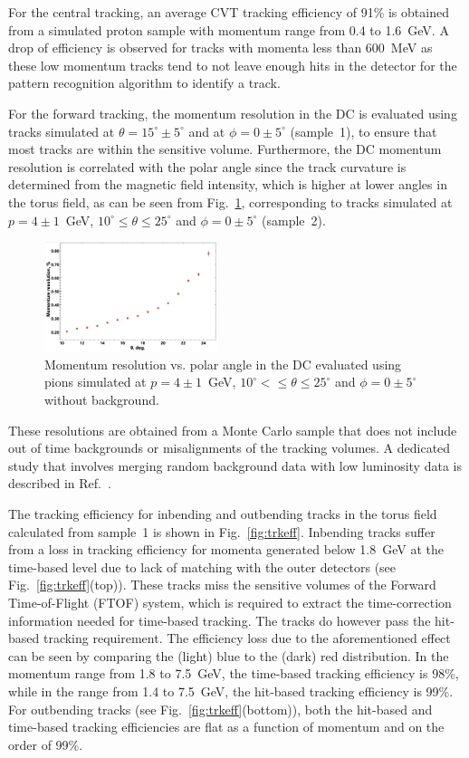 For the central tracking, an average CVT tracking efficiency of 91\% is obtained from a simulated proton sample with
momentum range from 0.4 to 1.6~GeV. A drop of efficiency is observed for tracks with momenta less than 600~MeV
as these low momentum tracks tend to not leave enough hits in the detector for the pattern recognition algorithm to
identify a track.  

For the forward tracking, the momentum resolution in the DC is evaluated using tracks simulated at
$\theta =15^\circ \pm 5^\circ$ and at $\phi = 0 \pm 5^\circ$ (sample~1), to ensure that most tracks are within the
sensitive volume. Furthermore, the DC momentum resolution is correlated with the polar angle since the track
curvature is determined from the magnetic field intensity, which is higher at lower angles in the torus field, as can
be seen from Fig.~\ref{fig:restheta}, corresponding to tracks simulated at $p=4\pm 1$~GeV,
$10^\circ \leq \theta \leq 25^\circ$ and $\phi = 0 \pm 5^\circ$ (sample~2).

\begin{figure}
\includegraphics[width=0.45\textwidth]{pics/DCRes2.png}
\caption{Momentum resolution vs. polar angle in the DC evaluated using pions simulated at $p=4\pm 1$~GeV,
  $10^\circ <\leq \theta \leq 25^\circ$ and $\phi = 0 \pm 5^\circ$ without background.}
\label{fig:restheta}
\end{figure}

These resolutions are obtained from a Monte Carlo sample that does not include out of time backgrounds or
misalignments of the tracking volumes. A dedicated study that involves merging random background data with
low luminosity data is described in Ref.~\cite{clas12-nim}.

The tracking efficiency for inbending and outbending tracks in the torus field calculated from sample~1 is shown in
Fig.~\ref{fig:trkeff}. Inbending tracks suffer from a loss in tracking efficiency for momenta generated below
1.8~GeV at the time-based level due to lack of matching with the outer detectors (see Fig.~\ref{fig:trkeff}(top)).
These tracks miss the sensitive volumes of the Forward Time-of-Flight (FTOF) system, which is required to extract
the time-correction information needed for time-based tracking. The tracks do however pass the hit-based tracking
requirement. The efficiency loss due to the aforementioned effect can be seen by comparing the (light) blue to the
(dark) red distribution. In the momentum range from 1.8 to 7.5~GeV, the time-based tracking efficiency is 98\%, 
while in the range from 1.4 to 7.5~GeV, the hit-based tracking efficiency is 99\%. For outbending tracks (see
Fig.~\ref{fig:trkeff}(bottom)), both the hit-based and time-based tracking efficiencies are flat as a function of
momentum and on the order of 99\%. 

